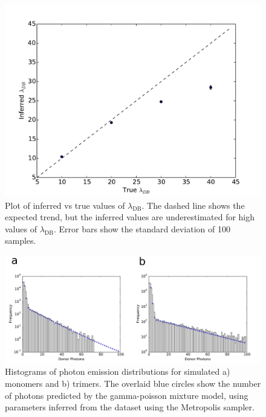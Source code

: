 \begin{figure}
   \begin{center}
      \includegraphics*[clip=true, width=6in]{sizing/divergence.pdf}
      \caption{Plot of inferred vs true values of $\lambda_{\text{DB}}$. The dashed line shows the expected trend, but the inferred values are underestimated for high values of $\lambda_{\text{DB}}$. Error bars show the standard deviation of 100 samples.}
      \label{fig:gamma_poisson_oligomers}
   \end{center}
\end{figure}

\begin{figure}
   \begin{center}
      \includegraphics*[clip=true, width=6in]{sizing/oligomer_marginals.pdf}
      \caption{Histograms of photon emission distributions for simulated a) monomers and b) trimers. The overlaid blue circles show the  number of photons predicted by the gamma-poisson mixture model, using parameters inferred from the dataset using the Metropolis sampler.}
      \label{fig:hist_fit_trimer}
   \end{center}
\end{figure}


